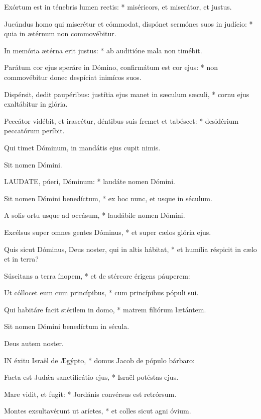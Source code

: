 Exórtum est in ténebris lumen rectis: * miséricors, et miserátor, et justus.

Jucúndus homo qui miserétur et cómmodat, dispónet sermónes suos in judício: * quia in ætérnum non commovébitur.

In memória ætérna erit justus: * ab auditióne mala non timébit.

Parátum cor ejus speráre in Dómino, confirmátum est cor ejus: * non commovébitur donec despíciat inimícos suos.

Dispérsit, dedit paupéribus: justítia ejus manet in sæculum sæculi, * cornu ejus exaltábitur in glória.

Peccátor vidébit, et irascétur, déntibus suis fremet et tabéscet: * desidérium peccatórum períbit.

 Qui timet Dóminum, in mandátis ejus cupit nimis.

 Sit nomen Dómini.


\lettrine[lines=2]{L}{AUDATE}, púeri, Dóminum: * laudáte nomen Dómini.

Sit nomen Dómini benedíctum, * ex hoc nunc, et usque in séculum.

A solis ortu usque ad occásum, * laudábile nomen Dómini.

Excélsus super omnes gentes Dóminus, * et super cælos glória ejus.

Quis sicut Dóminus, Deus noster, qui in altis hábitat, * et humília réspicit in cælo et in terra?

Súscitans a terra ínopem, * et de stércore érigens páuperem:

Ut cóllocet eum cum princípibus, * cum princípibus pópuli sui.

Qui habitáre facit stérilem in domo, * matrem filiórum lætántem.

 Sit nomen Dómini benedíctum in sécula.

 Deus autem noster.


\lettrine[lines=2]{I}{N} éxitu Israël de Ægýpto, * domus Jacob de pópulo bárbaro:

Facta est Judǽa sanctificátio ejus, * Israël potéstas ejus.

Mare vidit, et fugit: * Jordánis convérsus est retrórsum.

Montes exsultavérunt ut aríetes, * et colles sicut agni óvium.

